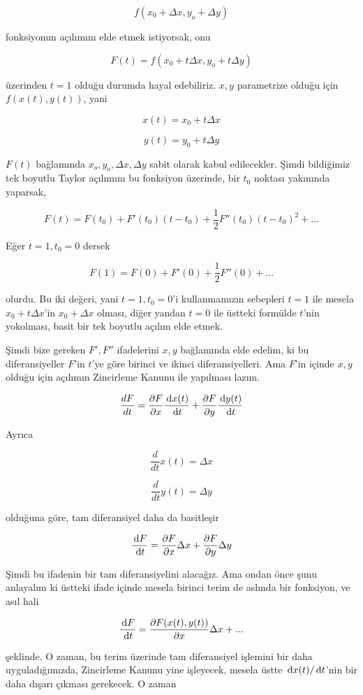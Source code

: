 \documentclass[12pt,fleqn]{article}\usepackage{../../common}
\begin{document}
$$ f(x_0 +\Delta x, y_o + \Delta y) $$

fonksiyonun açılımını elde etmek istiyorsak, onu

$$ F(t) = f(x_0 + t\Delta x, y_o + t\Delta y) $$

üzerinden $t=1$ olduğu durumda hayal edebiliriz. $x,y$ parametrize 
olduğu için  $f(x(t),y(t))$, yani

$$ x(t) = x_0 + t\Delta x $$

$$ y(t) = y_0 + t\Delta y $$

$F(t)$ bağlamında $x_o, y_o, \Delta x, \Delta y$ sabit olarak kabul edilecekler. 
Şimdi bildiğimiz
tek boyutlu Taylor açılımını bu fonksiyon üzerinde, bir $t_0$ noktası yakınında 
yaparsak,

$$ F(t) = F(t_0) + F'(t_0)(t-t_0) + \frac{1}{2}F''(t_0)(t-t_0)^2 + ... $$

Eğer $t=1,t_0=0$ dersek

$$ F(1) = F(0) + F'(0) + \frac{1}{2}F''(0) + ... $$

olurdu. Bu iki değeri, yani $t=1,t_0=0$'i kullanmamızın sebepleri $t=1$ ile
mesela $x_0 + t\Delta x$'in $x_0 + \Delta x$ olması, diğer yandan $t=0$ ile
üstteki formülde $t$'nin yokolması, basit bir tek boyutlu açılım elde
etmek.

Şimdi bize gereken $F',F''$ ifadelerini $x,y$ bağlamında elde edelim, ki bu
diferansiyeller $F$'in $t$'ye göre birinci ve ikinci diferansiyelleri. Ama
$F$'in içinde $x,y$ olduğu için açılımın Zincirleme Kanunu ile yapılması
lazım.

$$ \frac{dF}{dt} = \frac{\partial F}{\partial x}\frac{\,\mathrm{d} x(t)}{\,\mathrm{d} t} +
\frac{\partial F}{\partial y}\frac{\,\mathrm{d} y(t)}{\,\mathrm{d} t} 
 $$

Ayrıca

$$ \frac{d}{dt}x(t) = \Delta x $$

$$ \frac{d}{dt}y(t) = \Delta y $$

olduğuna göre, tam diferansiyel daha da basitleşir

$$ \frac{\,\mathrm{d} F}{\,\mathrm{d} t} = \frac{\partial F}{\partial x}\Delta x +
\frac{\partial F}{\partial y}\Delta y
$$

Şimdi bu ifadenin bir tam diferansiyelini alacağız. Ama ondan önce şunu
anlayalım ki üstteki ifade içinde mesela birinci terim de aslında bir
fonksiyon, ve asıl hali

$$ \frac{\,\mathrm{d} F}{\,\mathrm{d} t} = \frac{\partial F(x(t),y(t))}{\partial x}\Delta x + ...
 $$

şeklinde. O zaman, bu terim üzerinde tam diferansiyel işlemini bir daha
uyguladığımızda, Zincirleme Kanunu yine işleyecek, mesela üstte $\,\mathrm{d} x(t)/ \,\mathrm{d}
t$'nin bir daha dışarı çıkması gerekecek. O zaman
\end{document}
